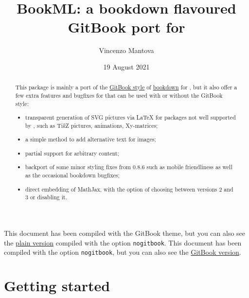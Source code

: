 \documentclass[a4paper,british]{article}
\title{BookML: a bookdown flavoured GitBook port for \LaTeXML{}}
\author{Vincenzo Mantova}
\date{19 August 2021}
\def\Xy{Xy}
\def\tikzname{Ti\emph{k}Z}
\def\ltxinline{\lstinline[style=bookml]}
\begin{document}
\maketitle

\begin{abstract}
  This package is mainly a port of the \href{https://bookdown.org/yihui/bookdown/html.html#gitbook-style}{GitBook style} of \href{https://bookdown.org}{bookdown} for \LaTeXML, but it also offer a few extra features and bugfixes for \LaTeXML{} that can be used with or without the GitBook style:
  \begin{itemize}
    \item transparent generation of SVG pictures via \LaTeX{} for packages not well supported by \LaTeXML{}, such as \tikzname{} pictures, animations, \Xy-matrices;
    \item a simple method to add alternative text for images;
    \item partial support for arbitrary \HTML{} content;
    \item backport of some minor styling fixes from \LaTeXML{} 0.8.6 such as mobile friendliness as well as the occasional bookdown bugfixes;
    \item direct embedding of MathJax, with the option of choosing between versions 2 and 3 or disabling it.
  \end{itemize}
\end{abstract}

\iflatexml\ifbmlGitBook
This document has been compiled with the GitBook theme, but you can also see the \href{index.nogitbook.html}{plain version} compiled with the option \ltxinline|nogitbook|.
\else
This document has been compiled with the option \ltxinline|nogitbook|, but you can also see the \href{.}{GitBook version}.
\fi\fi

\iflatexml\ifbmlGitBook\else
\tableofcontents
\fi\fi

\section{Getting started}
\end{document}
